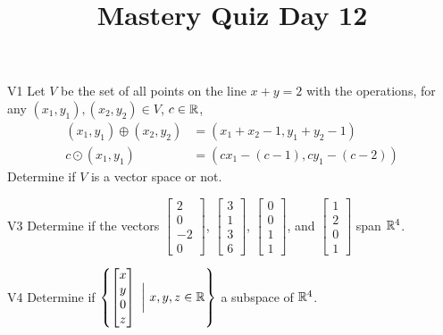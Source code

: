 \documentclass{sbgLAquiz}
\title{Mastery Quiz Day 12 }
\begin{document}
\begin{problem}{V1}
Let $V$ be the set of all points on the line $x+y=2$ with the operations, for any $(x_1,y_1), (x_2,y_2) \in V$, $c \in \mathbb{R}$,
\begin{align*}
(x_1,y_1) \oplus (x_2,y_2) &= (x_1+x_2-1,y_1+y_2-1) \\
c \odot (x_1,y_1) &= (cx_1-(c-1), cy_1-(c-2))
\end{align*}
Determine if $V$ is a vector space or not.
\end{problem}

\begin{problem}{V3}
Determine if the vectors $\begin{bmatrix} 2 \\ 0 \\ -2 \\ 0 \end{bmatrix}$, $\begin{bmatrix} 3 \\ 1 \\ 3 \\ 6 \end{bmatrix}$, $\begin{bmatrix} 0 \\ 0 \\ 1 \\ 1 \end{bmatrix}$, and $\begin{bmatrix}1 \\ 2 \\ 0 \\ 1 \end{bmatrix}$ span $\mathbb{R}^4$.
\end{problem}
\newpage

\begin{problem}{V4}
Determine if $\left\{ \begin{bmatrix} x \\ y \\ 0 \\ z \end{bmatrix}\  \bigg|\ x,y,z \in \mathbb{R}\right\}$  a subspace of $\mathbb{R}^4$.
\end{problem}
\end{document}
